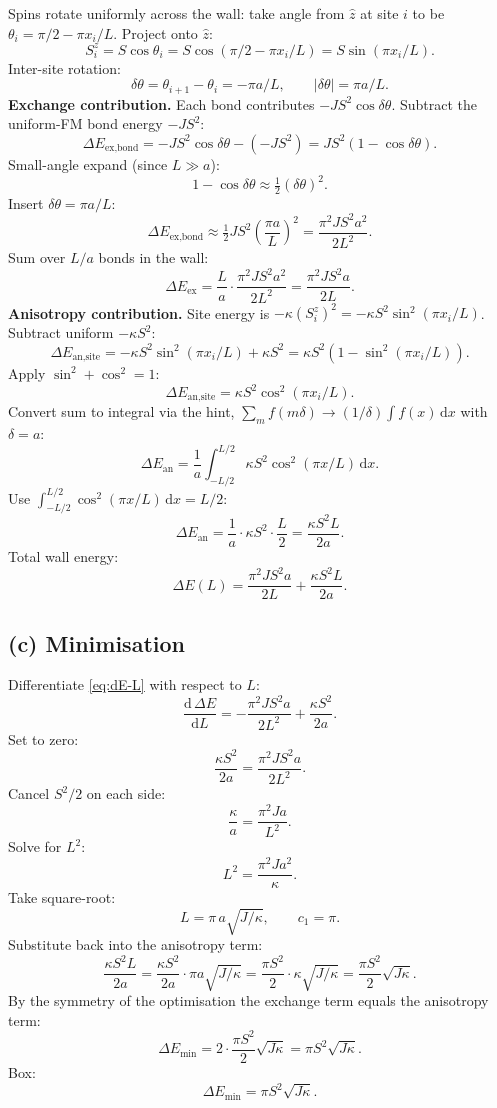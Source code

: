 \documentclass[11pt]{article}
\newcommand{\de}{\mathrm{d}}
\begin{document}
Spins rotate uniformly across the wall: take angle from $\hat z$ at site $i$ to be $\theta_i = \pi/2 - \pi x_i/L$. Project onto $\hat z$:
\[
S_i^z = S\cos\theta_i = S\cos(\pi/2 - \pi x_i/L) = S\sin(\pi x_i/L).
\]
Inter-site rotation:
\[
\delta\theta = \theta_{i+1} - \theta_i = -\pi a/L,\qquad |\delta\theta| = \pi a/L.
\]
\textbf{Exchange contribution.} Each bond contributes $-JS^2\cos\delta\theta$. Subtract the uniform-FM bond energy $-JS^2$:
\[
\Delta E_\text{ex,bond} = -JS^2\cos\delta\theta - (-JS^2) = JS^2(1-\cos\delta\theta).
\]
Small-angle expand (since $L\gg a$):
\[
1-\cos\delta\theta \approx \tfrac12(\delta\theta)^2.
\]
Insert $\delta\theta = \pi a/L$:
\[
\Delta E_\text{ex,bond} \approx \tfrac12 JS^2\!\left(\frac{\pi a}{L}\right)^2 = \frac{\pi^2 J S^2 a^2}{2L^2}.
\]
Sum over $L/a$ bonds in the wall:
\[
\Delta E_\text{ex} = \frac{L}{a}\cdot\frac{\pi^2 JS^2 a^2}{2L^2} = \frac{\pi^2 JS^2 a}{2L}.
\]
\textbf{Anisotropy contribution.} Site energy is $-\kappa(S_i^z)^2 = -\kappa S^2\sin^2(\pi x_i/L)$. Subtract uniform $-\kappa S^2$:
\[
\Delta E_\text{an,site} = -\kappa S^2\sin^2(\pi x_i/L) + \kappa S^2 = \kappa S^2(1-\sin^2(\pi x_i/L)).
\]
Apply $\sin^2+\cos^2 = 1$:
\[
\Delta E_\text{an,site} = \kappa S^2 \cos^2(\pi x_i/L).
\]
Convert sum to integral via the hint, $\sum_m f(m\delta)\to (1/\delta)\int f(x)\,\de x$ with $\delta = a$:
\[
\Delta E_\text{an} = \frac{1}{a}\int_{-L/2}^{L/2}\!\kappa S^2 \cos^2(\pi x/L)\,\de x.
\]
Use $\int_{-L/2}^{L/2}\cos^2(\pi x/L)\,\de x = L/2$:
\[
\Delta E_\text{an} = \frac{1}{a}\cdot\kappa S^2\cdot\frac{L}{2} = \frac{\kappa S^2 L}{2a}.
\]
Total wall energy:
\begin{equation}
\boxed{\;\Delta E(L) = \frac{\pi^2 J S^2 a}{2L} + \frac{\kappa S^2 L}{2a}.\;}
\label{eq:dE-L}
\end{equation}

\subsection*{(c) Minimisation}

Differentiate \eqref{eq:dE-L} with respect to $L$:
\[
\frac{\de\,\Delta E}{\de L} = -\frac{\pi^2 JS^2 a}{2L^2} + \frac{\kappa S^2}{2a}.
\]
Set to zero:
\[
\frac{\kappa S^2}{2a} = \frac{\pi^2 JS^2 a}{2L^2}.
\]
Cancel $S^2/2$ on each side:
\[
\frac{\kappa}{a} = \frac{\pi^2 J a}{L^2}.
\]
Solve for $L^2$:
\[
L^2 = \frac{\pi^2 J a^2}{\kappa}.
\]
Take square-root:
\[
\boxed{\;L = \pi\,a\sqrt{J/\kappa},\qquad c_1 = \pi.\;}
\]
Substitute back into the anisotropy term:
\[
\frac{\kappa S^2 L}{2a} = \frac{\kappa S^2}{2a}\cdot\pi a\sqrt{J/\kappa} = \frac{\pi S^2}{2}\cdot\kappa\sqrt{J/\kappa} = \frac{\pi S^2}{2}\sqrt{J\kappa}.
\]
By the symmetry of the optimisation the exchange term equals the anisotropy term:
\[
\Delta E_\text{min} = 2\cdot\frac{\pi S^2}{2}\sqrt{J\kappa} = \pi S^2\sqrt{J\kappa}.
\]
Box:
\[
\boxed{\;\Delta E_\text{min} = \pi S^2\sqrt{J\kappa}.\;}
\]
\end{document}
